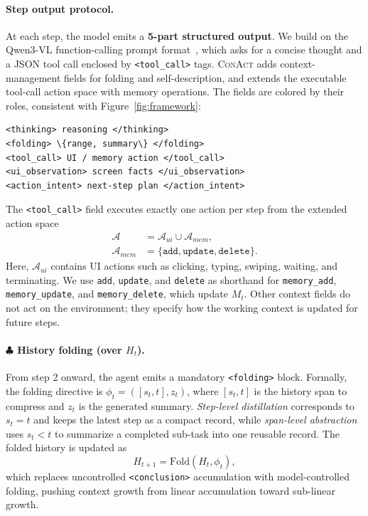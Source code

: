 \documentclass{llmxive}
\providecommand{\memaction}[1]{\texttt{#1}}
\providecommand{\foldop}[1]{\texttt{#1}}
\providecommand{\toolfield}[1]{\texttt{#1}}
\providecommand{\symfold}{$\clubsuit$\xspace}
\providecommand{\conact}{\textsc{ConAct}\xspace}
\begin{document}
\paragraph{Step output protocol.}
At each step, the model emits a \textbf{5-part structured output}. We build on the Qwen3-VL function-calling prompt format~\cite{bai2025qwen3}, which asks for a concise thought and a JSON tool call enclosed by \texttt{<tool\_call>} tags. \conact adds context-management fields for folding and self-description, and extends the executable tool-call action space with memory operations. The fields are colored by their roles, consistent with Figure~\ref{fig:framework}:

\begin{Verbatim}[commandchars=\\\{\},fontsize=\footnotesize]
<thinking> reasoning </thinking>
<folding> \{range, summary\} </folding>
<tool_call> UI / memory action </tool_call>
<ui_observation> screen facts </ui_observation>
<action_intent> next-step plan </action_intent>
\end{Verbatim}

The \toolfield{<tool\_call>} field executes exactly one action per step from the extended action space
\begin{equation}
\label{eq:action-space}
\begin{aligned}
\mathcal{A} &= \mathcal{A}_{ui}\cup\mathcal{A}_{mem},\\
\mathcal{A}_{mem} &= \{\memaction{add},\memaction{update},\memaction{delete}\}.
\end{aligned}
\end{equation}
Here, $\mathcal{A}_{ui}$ contains UI actions such as clicking, typing, swiping, waiting, and terminating. We use \memaction{add}, \memaction{update}, and \memaction{delete} as shorthand for \memaction{memory\_add}, \memaction{memory\_update}, and \memaction{memory\_delete}, which update $M_t$. Other context fields do not act on the environment; they specify how the working context is updated for future steps.

\paragraph{\symfold History folding (over \texorpdfstring{$H_t$}{Ht}).}
\label{sec:method-fold}
From step 2 onward, the agent emits a mandatory \foldop{<folding>} block. Formally, the folding directive is $\phi_t=([s_t,t],z_t)$, where $[s_t,t]$ is the history span to compress and $z_t$ is the generated summary. \emph{Step-level distillation} corresponds to $s_t=t$ and keeps the latest step as a compact record, while \emph{span-level abstraction} uses $s_t<t$ to summarize a completed sub-task into one reusable record. The folded history is updated as
\begin{equation}
\label{eq:history-update}
H_{t+1}
=
\mathrm{Fold}(
H_t,
\phi_t
),
\end{equation}
which replaces uncontrolled \texttt{<conclusion>} accumulation with model-controlled folding, pushing context growth from linear accumulation toward sub-linear growth.
\end{document}
